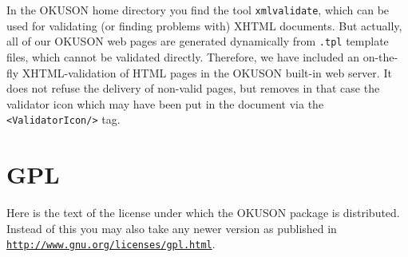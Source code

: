 \documentclass[12pt,openany,a4paper]{book}
\newcommand{\OKUSON}{\textsf{OKUSON}}
\begin{document}
In the {\OKUSON} home directory you find the tool \texttt{xmlvalidate},
which can be used for validating (or finding problems with) XHTML documents.
But actually, all of our {\OKUSON} web pages are generated dynamically from
\texttt{.tpl} template  files, which cannot be validated directly.  Therefore,
we have included an on-the-fly XHTML-validation of HTML pages in the
{\OKUSON} built-in web server. It does not refuse the delivery of non-valid
pages, but removes in that case the validator icon which may have been 
put in the document via the \texttt{<ValidatorIcon/>} tag.




\chapter{GPL}\label{ch:GPL}

Here is the text of the license under which the {\OKUSON} package is
distributed. Instead of this you may also take any newer version as
published in \\
\hspace*{5mm}\href{http://www.gnu.org/licenses/gpl.html}%
{\texttt{http://www.gnu.org/licenses/gpl.html}}.
\end{document}
